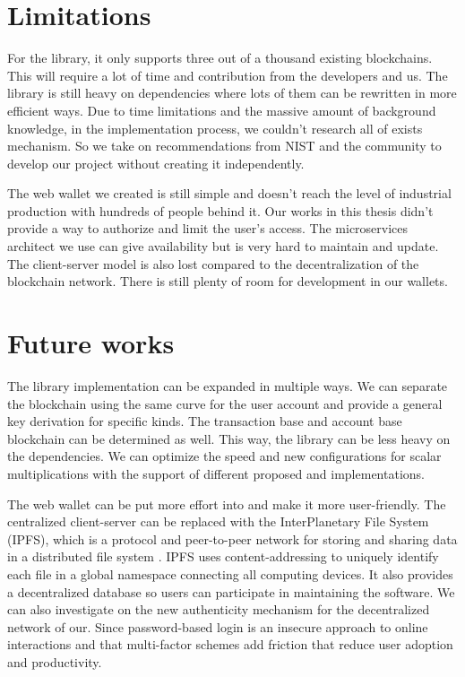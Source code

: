 \section{Limitations}

For the library, it only supports three out of a thousand existing blockchains. This will require a lot of time and contribution from the developers and us. The library is still heavy on dependencies where lots of them can be rewritten in more efficient ways. Due to time limitations and the massive amount of background knowledge, in the implementation process, we couldn't research all of exists mechanism. So we take on recommendations from NIST and the community to develop our project without creating it independently.


The web wallet we created is still simple and doesn't reach the level of industrial production with hundreds of people behind it. Our works in this thesis didn't provide a way to authorize and limit the user's access. The microservices architect we use can give availability but is very hard to maintain and update. The client-server model is also lost compared to the decentralization of the blockchain network. There is still plenty of room for development in our wallets.

\section{Future works}

The library implementation can be expanded in multiple ways. We can separate the blockchain using the same curve for the user account and provide a general key derivation for specific kinds. The transaction base and account base blockchain can be determined as well. This way, the library can be less heavy on the dependencies. We can optimize the speed and new configurations for scalar multiplications with the support of different proposed and implementations. 


The web wallet can be put more effort into and make it more user-friendly. The centralized client-server can be replaced with the InterPlanetary File System (IPFS), which is a protocol and peer-to-peer network for storing and sharing data in a distributed file system \cite{ifps}. IPFS uses content-addressing to uniquely identify each file in a global namespace connecting all computing devices. It also provides a decentralized database so users can participate in maintaining the software. We can also investigate on the new authenticity mechanism for the decentralized network of our. Since password-based login is an insecure approach to online interactions and that multi-factor schemes add friction that reduce user adoption and productivity. 
